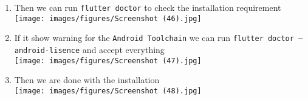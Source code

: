\documentclass[12pt,titlepage]{article}
\begin{document}
\begin{enumerate}
    \item Then we can run \texttt{flutter doctor} to check the installation requirement \\ \texttt{[image: images/figures/Screenshot (46).jpg]}
    \newpage
    \item If it show warning for the \texttt{Android Toolchain} we can run \texttt{flutter doctor --android-lisence} and accept everything \\ \texttt{[image: images/figures/Screenshot (47).jpg]}
    \item Then we are done with the installation \\ \texttt{[image: images/figures/Screenshot (48).jpg]}
\end{enumerate}
\end{document}
